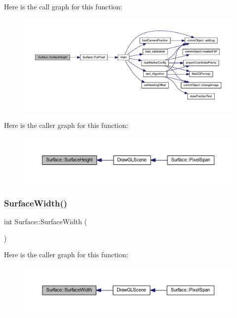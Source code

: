Here is the call graph for this function\+:\nopagebreak
\begin{figure}[H]
\begin{center}
\leavevmode
\includegraphics[width=350pt]{class_surface_a377c59f6ef131d4b879cda93578a3efa_cgraph}
\end{center}
\end{figure}
Here is the caller graph for this function\+:\nopagebreak
\begin{figure}[H]
\begin{center}
\leavevmode
\includegraphics[width=350pt]{class_surface_a377c59f6ef131d4b879cda93578a3efa_icgraph}
\end{center}
\end{figure}
\mbox{\label{class_surface_a4cbf23ea0c8ff533271109fc2a1a863d}} 
\subsubsection{Surface\+Width()}
{\footnotesize\ttfamily int Surface\+::\+Surface\+Width (\begin{DoxyParamCaption}{ }\end{DoxyParamCaption})\hspace{0.3cm}{\ttfamily [inline]}}

Here is the caller graph for this function\+:\nopagebreak
\begin{figure}[H]
\begin{center}
\leavevmode
\includegraphics[width=350pt]{class_surface_a4cbf23ea0c8ff533271109fc2a1a863d_icgraph}
\end{center}
\end{figure}
\mbox{\label{class_surface_ae76d7c2fa208df6979a77cc60e8105c0}} 

